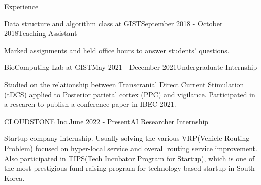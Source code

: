\documentclass{resume} %
\begin{document}

\begin{rSection}{Experience} \itemsep -5pt

\begin{rSubsection}{Data structure and algorithm class at GIST}{September 2018 - October 2018}{Teaching Assistant}{}
\item Marked assignments and held office hours to answer students' questions.
\end{rSubsection}

\begin{rSubsection}{BioComputing Lab at GIST}{May 2021 - December 2021}{Undergraduate Internship}{}
\item Studied on the relationship between Transcranial Direct Current Stimulation (tDCS) applied to Posterior parietal cortex (PPC) and vigilance. Participated in a research to publish a conference paper in IBEC 2021.
\end{rSubsection}

\begin{rSubsection}{CLOUDSTONE Inc.}{June 2022 - Present}{AI Researcher Internship}{}
\item Startup company internship. Usually solving the various VRP(Vehicle Routing Problem) focused on hyper-local service and overall routing service improvement. Also participated in TIPS(Tech Incubator Program for Startup), which is one of the most prestigious fund raising program for technology-based startup in South Korea.
\end{rSubsection}



\end{rSection}


\end{document}
